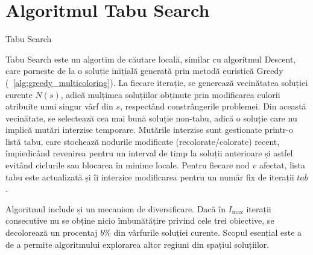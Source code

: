 \section{Algoritmul Tabu Search}


\begin{algorithm}[H]
\caption{Tabu Search}\label{alg:tabu_search}
\begin{algorithmic}[1]
\small
{}
     
    \Else{}
    \EndIf{}
    \EndIf{}
\EndWhile{}
\end{algorithmic}
\end{algorithm}
 Tabu Search este un algortim de căutare locală, similar cu algoritmul Descent, care pornește de la o soluție inițială generată prin metodă euristică Greedy (~\ref{alg:greedy_multicoloring}). La fiecare iterație, se generează vecinătatea soluției curente $N(s)$, adică mulțimea soluțiilor obținute prin modificarea culorii atribuite unui singur vârf din $s$, respectând constrângerile problemei. Din această vecinătate, se selectează cea mai bună soluție non-tabu, adică o soluție care nu implică mutări interzise temporare. Mutările interzise sunt gestionate printr-o listă tabu, care stochează nodurile modificate (recolorate/colorate) recent, împiedicând revenirea pentru un interval de timp la soluții anterioare și astfel evitând ciclurile sau blocarea în minime locale. Pentru fiecare nod $v$ afectat, lista tabu este actualizată și îi interzice modificarea pentru un număr fix de iterații $tab$.


 Algoritmul include și un mecanism de diversificare. Dacă în $I_{\max}$ iterații consecutive nu se obține nicio îmbunătățire privind cele trei obiective, se decolorează  un procentaj $b\%$ din vârfurile soluției curente. Scopul esențial este a de a permite algoritmului explorarea altor regiuni din spațiul soluțiilor.


